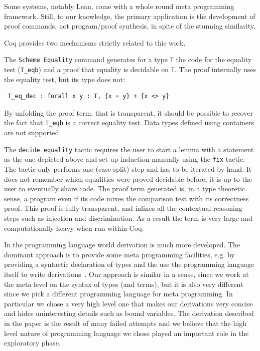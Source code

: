 \documentclass[sigplan,10pt,review]{acmart}\settopmatter{printfolios=true,printccs=false,printacmref=false}
\begin{document}
Some systems, notably Lean, come with a whole round meta programming 
framework. Still, to our knowledge, the primary application is the
development of proof commands, not program/proof synthesis, in spite
of the stunning similarity.

Coq provides two mechanisms strictly related to this work.

The \lstinline+Scheme Equality+ command generates for a type
\lstinline+T+ the code for the equality test (\lstinline+T_eqb+) 
and a proof that equality is decidable on \lstinline+T+. The proof
internally uses the equality test, but its type does not:

\begin{minipage}{\textwidth}\begin{lstlisting}
 T_eq_dec : forall x y : T, {x = y} + {x <> y}
\end{lstlisting}\end{minipage}

\noindent
By unfolding the proof term, that is transparent, it should be
possible to recover the fact that \lstinline+T_eqb+ is a correct
equality test. Data types defined using containers are not supported.

The \lstinline+decide equality+ tactic requires the user to start
a lemma with a statement as the one depicted above and
set up induction manually using the \lstinline+fix+
tactic. The tactic only performs one (case split) step and has to
be iterated by hand. It does not remember which equalities were
proved decidable before, it is up to the user to eventually share code.
The proof term generated is, in a type theoretic sense, a program
even if its code mixes the comparison test with its correctness proof.
This proof is fully transparent, and inlines all the contextual
reasoning steps such as injection and discrimination. As a result the
term is very large and computationally heavy when run within Coq.

In the programming language world derivation is much more developed.
The dominant approach is to provide some meta programming facilities,
e.g. by providing a syntactic declaration of types and the use the
programming language itself to write 
derivations~\cite{Sheard:2002:TMH:636517.636528}. Our approach
is similar in a sense, since we work at the meta level on the syntax of
types (and terms), but it is also very different since we pick a
different programming language for meta programming. 
In particular we chose a very high level one that
makes our derivations very concise and hides uninteresting details
such as bound variables. The derivation described in the paper 
is the result of many failed attempts and we believe that the
high level nature of programming language we chose played an
important role in the exploratory phase.
\end{document}
